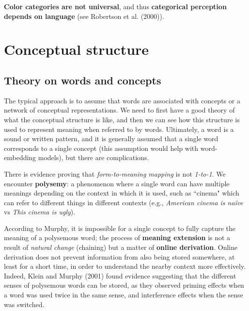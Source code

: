 \textbf{Color categories are not universal}, and thus \textbf{categorical perception depends on language} (see \notedv Robertson et al. (2000)).


\section{Conceptual structure}
\label{sec:conceptual_structure}

\subsection{Theory on words and concepts}
The typical approach is to assume that words are associated with concepts or a network of conceptual representations.
We need to first have a good theory of what the conceptual structure is like, and then we can see how this structure is used to represent meaning when referred to by words.
Ultimately, a word is a sound or written pattern, and it is generally assumed that a single word corresponds to a single concept (this assumption would help with word-embedding models), but there are complications.

There is evidence proving that \textit{form-to-meaning mapping} is not \textit{1-to-1}. We encounter \textbf{polysemy}: a phenomenon where a single word can have multiple meanings depending on the context in which it is used, such as ``cinema" which can refer to different things in different contexts (e.g., \textit{American cinema is naïve} vs \textit{This cinema is ugly}).

According to Murphy, it is impossible for a single concept to fully capture the meaning of a polysemous word; the process of \textbf{meaning extension} is not a result of \textit{natural change} (chaining) but a matter of \textbf{online derivation}. Online derivation does not prevent information from also being stored somewhere, at least for a short time, in order to understand the nearby context more effectively. Indeed, Klein and Murphy (2001) found evidence suggesting that the different senses of polysemous words can be stored, as they observed priming effects when a word was used twice in the same sense, and interference effects when the sense was switched.

